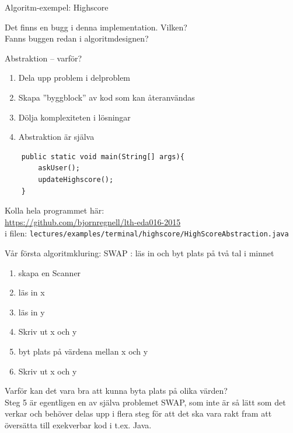 \documentclass{lecturenotes}
\begin{document}
\begin{Slide}{Algoritm-exempel: Highscore}

Det finns en bugg i denna implementation. Vilken? \\ Fanns buggen redan i algoritmdesignen?
\end{Slide}

\begin{Slide}{Abstraktion -- varför?}
\begin{enumerate}
\item Dela upp problem i delproblem
\item Skapa ''byggblock'' av kod som kan återanvändas
\item Dölja komplexiteten i lösningar
\item Abstraktion är själva 
\end{enumerate}
\begin{lstlisting}
    public static void main(String[] args){
    	askUser();
    	updateHighscore();
    }
\end{lstlisting}
Kolla hela programmet här:\\ \href{https://github.com/bjornregnell/lth-eda016-2015/blob/master/lectures/examples/terminal/highscore/HighScoreAbstraction.java}{https://github.com/bjornregnell/lth-eda016-2015} \\
i filen: \scriptsize\texttt{lectures/examples/terminal/highscore/HighScoreAbstraction.java}
\end{Slide}

\begin{Slide}{Vår första algoritmkluring: SWAP}
: läs in och byt plats på två tal i minnet \\ \vspace{1em}
\pause
{}
\begin{enumerate}
\item skapa en Scanner
\item  läs in x
\item  läs in y
\item  Skriv ut x och y
\item  byt plats på värdena mellan x och y
\item  Skriv ut x och y
\end{enumerate}
\vspace{2em}
\footnotesize Varför kan det vara bra att kunna byta plats på olika värden? \\ \vspace{1em}\scriptsize
Steg 5 är egentligen en  av själva problemet SWAP, som inte är så lätt som det verkar och behöver delas upp i flera steg för att det ska vara rakt fram att översätta till exekverbar kod i t.ex. Java.
\end{Slide}
\end{document}
